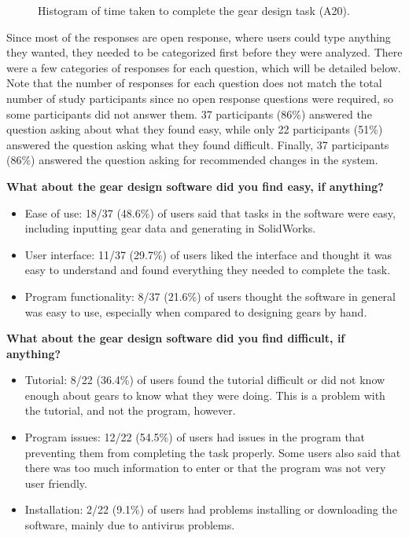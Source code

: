 \begin{doublespace}
\begin{figure}[htbp]
    \centering
{}
    \caption{Histogram of time taken to complete the gear design task (A20).}
    \label{fig:hist_time}
\end{figure}

Since most of the responses are open response, where users could type anything they wanted, they needed to be categorized first before they were analyzed. There were a few categories of responses for each question, which will be detailed below. Note that the number of responses for each question does not match the total number of study participants since no open response questions were required, so some participants did not answer them. 37 participants (86\%) answered the question asking about what they found easy, while only 22 participants (51\%) answered the question asking what they found difficult. Finally, 37 participants (86\%) answered the question asking for recommended changes in the system.

\begin{singlespace}
\textbf{What about the gear design software did you find easy, if anything?}
\begin{itemize}
    \item Ease of use: 18/37 (48.6\%) of users said that tasks in the software were easy, including inputting gear data and generating in SolidWorks.
    \item User interface: 11/37 (29.7\%) of users liked the interface and thought it was easy to understand and found everything they needed to complete the task.
    \item Program functionality: 8/37 (21.6\%) of users thought the software in general was easy to use, especially when compared to designing gears by hand.
\end{itemize}

\textbf{What about the gear design software did you find difficult, if anything?}
\begin{itemize}
    \item Tutorial: 8/22 (36.4\%) of users found the tutorial difficult or did not know enough about gears to know what they were doing. This is a problem with the tutorial, and not the program, however.
    \item Program issues: 12/22 (54.5\%) of users had issues in the program that preventing them from completing the task properly. Some users also said that there was too much information to enter or that the program was not very user friendly.
    \item Installation: 2/22 (9.1\%) of users had problems installing or downloading the software, mainly due to antivirus problems.
\end{itemize}


\end{singlespace}
\end{doublespace}
